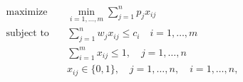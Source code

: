 \begin{align*}
\text{maximize} \quad & \min_{i=1, \ldots, m} \sum_{j=1}^n p_j x_{ij} \\
\text{subject to} \quad & \sum_{j=1}^n w_j x_{ij} \leq c_i \quad i = 1, \ldots, m \\
& \sum_{i=1}^m x_{ij} \leq 1, \quad j = 1, \ldots, n \\
& x_{ij} \in \lbrace 0, 1 \rbrace, \quad j = 1, \ldots,n, \quad i = 1, \ldots, n,
\end{align*}
